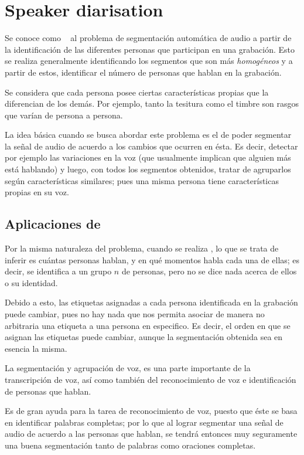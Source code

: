 
\chapter{Speaker diarisation} \label{ch:chap2}

Se conoce como \SD~ al problema de segmentación automática de audio a partir de la identificación de las diferentes personas que participan en una grabación. Esto se realiza generalmente identificando los segmentos que son más \textit{homogéneos} y a partir de estos, identificar el número de personas que hablan en la grabación.

Se considera que cada persona posee ciertas características propias que la diferencian de los demás. Por ejemplo, tanto la tesitura como el timbre son rasgos que varían de persona a persona.

La idea básica cuando se busca abordar este problema es el de poder segmentar la señal de audio de acuerdo a los cambios que ocurren en ésta. Es decir, detectar por ejemplo las variaciones en la voz (que usualmente implican que alguien más está hablando) y luego, con todos los segmentos obtenidos, tratar de agruparlos según características similares; pues una misma persona tiene características propias en su voz. 

\section{Aplicaciones de \sd}

Por la misma naturaleza del problema, cuando se realiza \sd, lo que se trata de inferir es cuántas personas hablan, y en qué momentos habla cada una de ellas; es decir, se identifica a un grupo $n$ de personas, pero no se dice nada acerca de ellos o su identidad. 

Debido a esto, las etiquetas asignadas a cada persona identificada en la grabación puede cambiar, pues no hay nada que nos permita asociar de manera no arbitraria una etiqueta a una persona en especifico. Es decir, el orden en que se asignan las etiquetas puede cambiar, aunque la segmentación obtenida sea en esencia la misma.

La segmentación y agrupación de voz, es una parte importante de la transcripción de voz, así como también del reconocimiento de voz e identificación de personas que hablan. 

Es de gran ayuda para la tarea de reconocimiento de voz, puesto que éste se basa en identificar palabras completas; por lo que al lograr segmentar una señal de audio de acuerdo a las personas que hablan, se tendrá entonces muy seguramente una buena segmentación tanto de palabras como oraciones completas.

